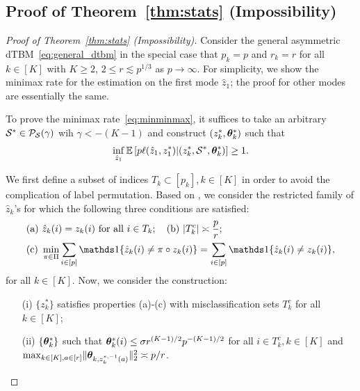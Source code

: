 \documentclass[journal]{IEEEtran}
\theoremstyle{definition}
\theoremstyle{definition}
\begin{document}
\subsection{Proof of Theorem~\ref{thm:stats} (Impossibility)}\label{sec:statprove1}

\begin{proof}[Proof of Theorem~\ref{thm:stats} (Impossibility)]Consider the general asymmetric dTBM~\eqref{eq:general_dtbm} in the special case that $p_k = p$ and $r_k = r$ for all $ k\in [K]$ {with $K\geq 2$, $2 \leq r\lesssim p^{1/3}$ as $p \rightarrow \infty$}. For simplicity, we show the minimax rate for the estimation on the first mode $\hat z_1$; the proof for other modes are essentially the same. 
   
   To prove the minimax rate~\eqref{eq:minminmax}, it suffices to take an arbitrary $\mathcal{S}^* \in  \mathcal{P}_{\mathcal{S}}(\gamma)$ wih $\gamma < -(K-1)$ and construct $(z^*_k, \boldsymbol{\theta}^*_k)$ such that 
   \begin{equation}
       \inf_{\hat z_1} \mathbb{E} \left[ p\ell(\hat z_1, z_1^*) | (z^*_k, \mathcal{S}^*,  \boldsymbol{\theta}^*_k)  \right]\geq 1.
   \end{equation}
   
   We first define a subset of indices $T_k \subset [p_k], k \in [K]$ in order to avoid the complication of label permutation. Based on \cite[Proof of Theorem 6]{han2020exact}, we consider the restricted family of $\hat z_k$'s for which the following three conditions are satisfied:
   \begin{align}
        &\text{(a)}\ \hat z_k(i)=z_k(i) \text{ for all }i\in T_k; \quad \text{(b)} \ |T^c_k|\asymp {p\over r}; \\
        &\text{(c)}\ \min_{\pi\in \Pi}\sum_{i\in[p]}\ind\{\hat z_k(i) \neq \pi\circ z_k (i)\} = \sum_{i\in[p]}\ind\{\hat z_k(i) \neq  z_k (i)\},
   \end{align}
for all $k \in [K]$.
   Now, we consider the construction:
   \begin{enumerate}
       \item[(i)] $\{z_k^*\}$ satisfies properties (a)-(c) with misclassification sets $T_k^c$ for all $k \in [K]$;
       \item [(ii)] $\{\boldsymbol{\theta}_k^*\}$ such that $\boldsymbol{\theta}_k^*(i) \leq \sigma r^{(K-1)/2} p^{-(K-1)/2}$ for all $i \in T_k^c, k \in [K]$ and $\max_{k \in [K], a \in [r]} \lVert\boldsymbol{\theta}_{k, z^{*, -1}_k(a)}\rVert^2_2 \asymp p/r$.
   \end{enumerate}
   

\end{proof}
\end{document}
